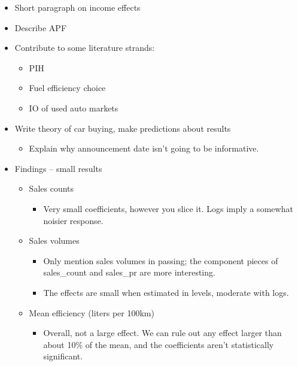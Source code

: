 \documentclass[11pt,letterpaper,oneside]{article}
\begin{document}
\begin{itemize}
    \item Short paragraph on income effects
    \item Describe APF
    \item Contribute to some literature strands:
    \begin{itemize}
        \item PIH
        \item Fuel efficiency choice
        \item IO of used auto markets
    \end{itemize}
    \item Write theory of car buying, make predictions about results
    \begin{itemize}
        \item Explain why announcement date isn't going to be informative.
    \end{itemize}

    \item Findings -- small results
    \begin{itemize}
        \item Sales counts
        \begin{itemize}
            \item Very small coefficients, however you slice it.  Logs imply a somewhat noisier response.
        \end{itemize}

        \item Sales volumes
        \begin{itemize}
            \item  Only mention sales volumes in passing; the component pieces of sales\_count and sales\_pr are more interesting.
            \item The effects are small when estimated in levels, moderate with logs.
        \end{itemize}
        \item Mean efficiency (liters per 100km)
        \begin{itemize}
            \item Overall, not a large effect. We can rule out any effect larger than about 10\% of the mean, and the coefficients aren't statistically significant.


\end{itemize}
\end{itemize}
\end{itemize}
\end{document}

